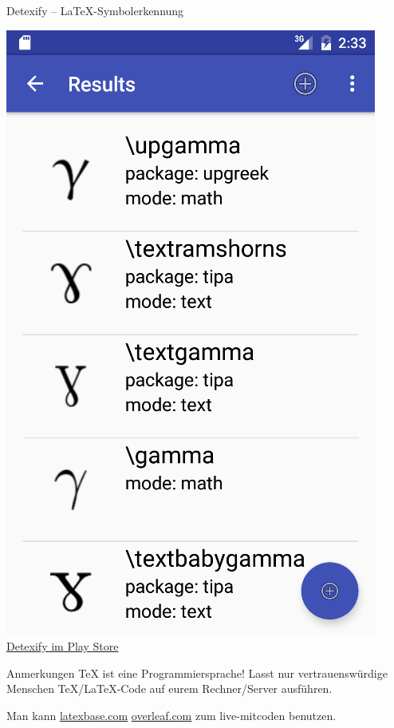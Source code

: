 \documentclass{beamer}
\begin{document}
\begin{frame}{Detexify -- \LaTeX-Symbolerkennung}
\begin{minipage}{0.45\textwidth}
\begin{center}
			\includegraphics[height=0.48\textheight]{images/detexify-app2}
			\vspace{0.5cm}
			\Large \href{https://play.google.com/store/apps/details?id=website.marty.detexify}{Detexify im Play Store}
			\end{center}
		\end{minipage}
				
		\end{frame}

		
		
		\begin{frame}{Anmerkungen}
			 \TeX{} ist eine Programmiersprache! Lasst nur vertrauenswürdige
			Menschen \TeX/\LaTeX-Code auf eurem Rechner/Server ausführen.
			
			\vspace{0.2cm}
			 Man kann \href{https://latexbase.com}{latexbase.com} \href{https://www.overleaf.com}{overleaf.com} zum live-mitcoden benutzen.
		\end{frame}
		
\end{document}

